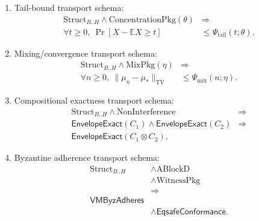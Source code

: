 \documentclass[a4paper,10pt,twocolumn,english]{article}
\numberwithin{equation}{section}
\theoremstyle{paperdef}
\theoremstyle{paperplain}
\theoremstyle{paperdef}
\theoremstyle{paperremark}
\theoremstyle{paperdef}
\newcommand{\EnvelopeExact}{\ensuremath{\mathsf{EnvelopeExact}}}
\newcommand{\EqsafeConformance}{\ensuremath{\mathsf{EqsafeConformance}}}
\begin{document}
\begin{enumerate}
	\item Tail-bound transport schema:
	      \begin{equation}
		      \begin{aligned}
			      \text{Struct}_{B..H} \land \text{ConcentrationPkg}(\theta)
			       & \Longrightarrow                     \\
			      \forall t \ge 0,\ \Pr[X - \mathbb{E}X \ge t]
			       & \le \Psi_{\mathrm{tail}}(t;\theta).
		      \end{aligned}
	      \end{equation}
	\item Mixing/convergence transport schema:
	      \begin{equation}
		      \begin{aligned}
			      \text{Struct}_{B..H} \land \text{MixPkg}(\eta)
			       & \Longrightarrow                  \\
			      \forall n \ge 0,\ \|\mu_n - \mu_*\|_{\mathrm{TV}}
			       & \le \Psi_{\mathrm{mix}}(n;\eta).
		      \end{aligned}
	      \end{equation}
	\item Compositional exactness transport schema:
	      \begin{equation}
		      \begin{aligned}
			      \text{Struct}_{B..H} \land \text{NonInterference}
			       & \Longrightarrow \\
			      \EnvelopeExact(C_1) \land \EnvelopeExact(C_2)
			       & \Rightarrow     \\
			      \EnvelopeExact(C_1 \otimes C_2).
		      \end{aligned}
	      \end{equation}
	\item Byzantine adherence transport schema:
	      \begin{equation}
		      \begin{aligned}
			      \text{Struct}_{B..H}
			       & \land \text{ABlockD}      \\
			       & \land \text{WitnessPkg}   \\
			       & \Longrightarrow           \\
			      \mathsf{VMByzAdheres}
			       &                           \\
			       & \land \EqsafeConformance.
		      \end{aligned}
	      \end{equation}
\end{enumerate}
\end{document}
